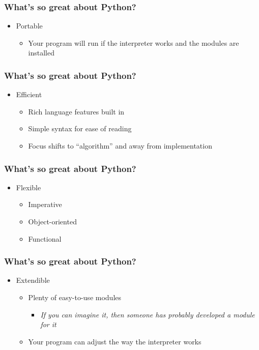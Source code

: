 \documentclass[xcolor=table,10pt,final]{beamer}
\begin{document}
\begin{frame}
  \frametitle{What's so great about Python?}
  \begin{itemize}
    \item Portable
      \begin{itemize}
        \item Your program will run if the interpreter works and the modules are installed
      \end{itemize}
  \end{itemize}
\end{frame}
\begin{frame}
  \frametitle{What's so great about Python?}
  \begin{itemize}
    \item Efficient
      \begin{itemize}
        \item Rich language features built in
        \item Simple syntax for ease of reading
        \item Focus shifts to ``algorithm'' and away from implementation
      \end{itemize}
  \end{itemize}
\end{frame}
\begin{frame}
  \frametitle{What's so great about Python?}
  \begin{itemize}
    \item Flexible
      \begin{itemize}
        \item Imperative
        \item Object-oriented
        \item Functional
      \end{itemize}
  \end{itemize}
\end{frame}
\begin{frame}
  \frametitle{What's so great about Python?}
  \begin{itemize}
    \item Extendible
      \begin{itemize}
        \item Plenty of easy-to-use modules
          \begin{itemize}
            \item {\it If you can imagine it, then someone has probably developed a module for it}
          \end{itemize}
        \item Your program can adjust the way the interpreter works
      \end{itemize}
  \end{itemize}
\end{frame}
\end{document}
